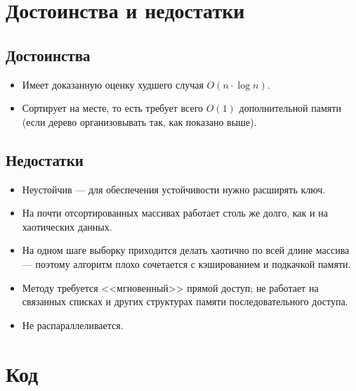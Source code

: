 \documentclass{book}
\begin{document}
\section*{Достоинства и недостатки}
\subsection*{Достоинства}
\begin{itemize}
    \item Имеет доказанную оценку худшего случая $O(n\cdot \log n)$.
    \item Сортирует на месте, то есть требует всего $O(1)$ дополнительной памяти (если дерево организовывать так, как показано выше).
\end{itemize}
\subsection*{Недостатки}
\begin{itemize}
    \item Неустойчив — для обеспечения устойчивости нужно расширять ключ.
    \item На почти отсортированных массивах работает столь же долго, как и на хаотических данных.
    \item На одном шаге выборку приходится делать хаотично по всей длине массива --- поэтому алгоритм плохо сочетается с кэшированием и подкачкой памяти.
    \item Методу требуется <<мгновенный>> прямой доступ; не работает на связанных списках и других структурах памяти последовательного доступа.
    \item Не распараллеливается.
\end{itemize}



\section*{Код}
\end{document}
